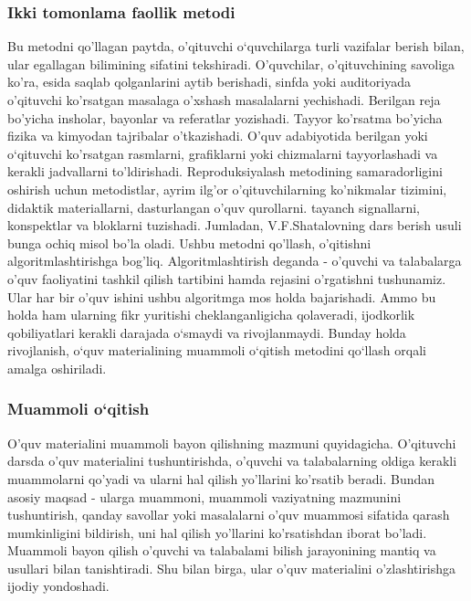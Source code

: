 \documentclass[epsf]{article}
\begin{document}
\subsubsection{Ikki tomonlama faollik metodi}
\hspace{0.4cm}
Bu metodni qo'llagan paytda, o'qituvchi o‘quvchilarga turli vazifalar
berish bilan, ular egallagan bilimining sifatini tekshiradi. O'quvchilar, o'qituvchining savoliga ko'ra, esida saqlab qolganlarini aytib berishadi, sinfda
yoki auditoriyada o'qituvchi ko'rsatgan masalaga o'xshash masalalarni yechishadi. Berilgan reja bo'yicha insholar, bayonlar va referatlar yozishadi.
Tayyor ko'rsatma bo'yicha fizika va kimyodan tajribalar o'tkazishadi.
O'quv adabiyotida berilgan yoki o`qituvchi ko'rsatgan rasmlarni, grafiklarni
yoki chizmalarni tayyorlashadi va kerakli jadvallarni to'ldirishadi.
Reproduksiyalash
metodining samaradorligini
oshirish
uchun
metodistlar, ayrim ilg'or o'qituvchilarning ko'nikmalar tizimini, didaktik
materiallarni, dasturlangan o'quv qurollarni. tayanch signallarni, konspektlar va bloklarni tuzishadi. Jumladan, V.F.Shatalovning dars berish usuli bunga ochiq misol bo'la oladi. Ushbu metodni qo'llash, o'qitishni algoritmlashtirishga bog'liq. Algoritmlashtirish deganda - o'quvchi va talabalarga o'quv faoliyatini tashkil qilish tartibini hamda rejasini o'rgatishni
tushunamiz. Ular har bir o'quv ishini ushbu algoritmga mos holda bajarishadi. Ammo bu holda ham ularning fikr yuritishi cheklanganligicha qolaveradi, ijodkorlik qobiliyatlari kerakli darajada o`smaydi va rivojlanmaydi. Bunday holda rivojlanish, o`quv materialining muammoli o`qitish metodini qo`llash orqali amalga oshiriladi.

\subsubsection{Muammoli o`qitish}
\hspace{0.4cm}
O’quv materialini muammoli bayon qilishning mazmuni quyidagicha.
O'qituvchi darsda o’quv materialini tushuntirishda, o'quvchi va talabalarning
oldiga kerakli muammolarni qo'yadi va ularni hal qilish yo'llarini ko'rsatib
beradi. Bundan asosiy maqsad - ularga muammoni, muammoli vaziyatning
mazmunini tushuntirish, qanday savollar yoki masalalarni o'quv muammosi
sifatida qarash mumkinligini bildirish, uni hal qilish yo'llarini ko'rsatishdan
iborat bo'ladi. Muammoli bayon qilish o'quvchi va talabalami bilish
jarayonining mantiq va usullari bilan tanishtiradi. Shu bilan birga, ular o'quv
materialini o'zlashtirishga ijodiy yondoshadi.
\end{document}
